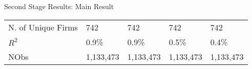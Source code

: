 \documentclass{beamer}
\begin{document}
\begin{frame}{Second Stage Results: Main Result}
{\begin{tabular}{l*{4}{l}}
            N. of Unique Firms & 742                              & 742                             & 742       & 742       \\
            \(R^{2}\)          & 0.9\%                            & 0.9\%                           & 0.5\%     & 0.4\%     \\
            NObs               & 1,133,473                        & 1,133,473                       & 1,133,473 & 1,133,473 \\
            \bottomrule
        \end{tabular}
    }

\end{frame}
\end{document}
